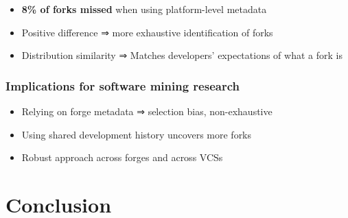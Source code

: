 \documentclass[aspectratio=169,xcolor=table]{beamer}
\begin{document}
\begin{frame}
        \begin{block}{}
            \begin{itemize}
                \item \textbf{8\% of forks missed} when using platform-level
                    metadata
                \item Positive difference ⇒ more exhaustive identification of
                    forks
                \item Distribution similarity ⇒ Matches developers'
                    expectations of what a fork is
            \end{itemize}
        \end{block}
    \end{frame}

    \begin{frame}
        \frametitle{Implications for software mining research}

        \begin{block}{}
            \begin{itemize}
                \item Relying on forge metadata ⇒ selection bias,
                    non-exhaustive
                \item Using shared development history uncovers more forks
                \item Robust approach across forges and across VCSs
            \end{itemize}
        \end{block}

    \end{frame}

    \section{Conclusion}
\end{document}
